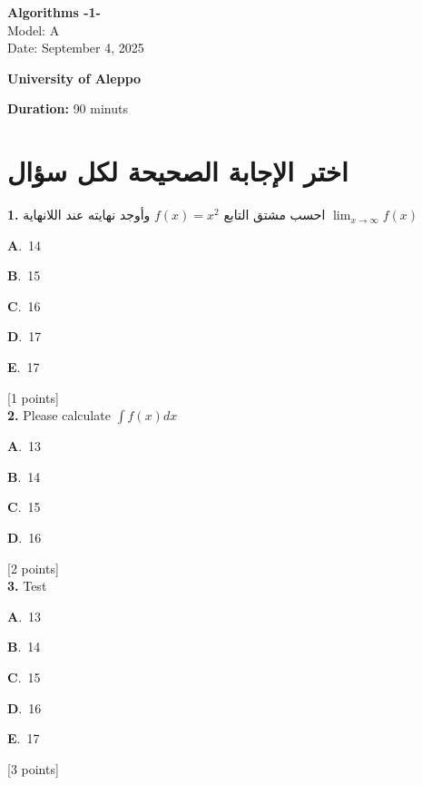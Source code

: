\documentclass[12pt]{article}
\newcommand{\choice}[3]{%
  \noindent\textbf{#1}.~#2\hfill#3\par\vspace{0.25em}
}
\begin{document}
\begin{flushright}
{\Large \textbf{{\textenglish{Algorithms -1-}}}}\\[0.25em]
{\normalsize \textenglish{Model: }{\textenglish{A}}}\\[0.1em]
{\normalsize \textenglish{Date: }{\textenglish{September 4, 2025}}}
\end{flushright}

\vspace{0.6cm}

\noindent
\begin{minipage}[t]{0.65\textwidth}
  \raggedright
  \textbf{{\textenglish{University of Aleppo}}}\\[0.3em]
\end{minipage}\hfill
\begin{minipage}[t]{0.3\textwidth}
  \raggedleft
  \textenglish{\textbf{Duration: }}{\textenglish{90 minuts}}
\end{minipage}

\vspace{0.9cm}

\section*{اختر الإجابة الصحيحة لكل سؤال}

\noindent \textbf{\textenglish{1.}} {\textarabic{احسب مشتق التابع }}\( f(x) = x^2\){\textarabic{ وأوجد نهايته عند اللانهاية }}\(\lim_{x \to \infty}f(x)\)

\noindent\choice{A}{{\textenglish{14}}}{}
\noindent\choice{B}{{\textenglish{15}}}{}
\noindent\choice{C}{{\textenglish{16}}}{}
\noindent\choice{D}{{\textenglish{17}}}{}
\noindent\choice{E}{{\textenglish{17}}}{}
\hfill {\textenglish{[1 points]}}\\[0.5em]

\noindent \textbf{\textenglish{2.}} {\textenglish{Please calculate }}\(\int f(x)dx\)

\noindent\choice{A}{{\textenglish{13}}}{}
\noindent\choice{B}{{\textenglish{14}}}{}
\noindent\choice{C}{{\textenglish{15}}}{}
\noindent\choice{D}{{\textenglish{16}}}{}
\hfill {\textenglish{[2 points]}}\\[0.5em]

\noindent \textbf{\textenglish{3.}} {\textenglish{Test}}

\noindent\choice{A}{{\textenglish{13}}}{}
\noindent\choice{B}{{\textenglish{14}}}{}
\noindent\choice{C}{{\textenglish{15}}}{}
\noindent\choice{D}{{\textenglish{16}}}{}
\noindent\choice{E}{{\textenglish{17}}}{}
\hfill {\textenglish{[3 points]}}\\[0.5em]
\end{document}
